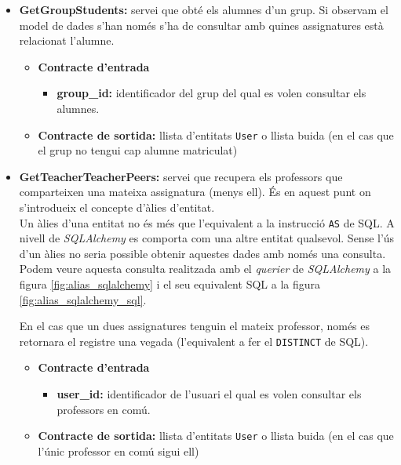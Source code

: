 \begin{itemize}
			\item \textbf{GetGroupStudents:} servei que obté els alumnes d'un grup. Si observam el model de dades s'han només s'ha de consultar amb quines assignatures està relacionat l'alumne.
				\begin{itemize}
					\item \textbf{Contracte d'entrada}
						\begin{itemize}
							\item \textbf{group\_id:} identificador del grup del qual es volen consultar els alumnes.
						\end{itemize}
					\item \textbf{Contracte de sortida:} llista d'entitats \texttt{User} o llista buida (en el cas que el grup no tengui cap alumne matriculat)
				\end{itemize}
				
			\item \textbf{GetTeacherTeacherPeers:} servei que recupera els professors que comparteixen una mateixa assignatura (menys ell). És en aquest punt on s'introdueix el concepte d'àlies d'entitat. \\
			
			Un àlies d'una entitat no és més que l'equivalent a la instrucció \texttt{AS} de \ac{SQL}. A nivell de \emph{SQLAlchemy} es comporta com una altre entitat qualsevol. Sense l'ús d'un àlies no seria possible obtenir aquestes dades amb només una consulta. Podem veure aquesta consulta realitzada amb el \emph{querier} de \emph{SQLAlchemy} a la figura \ref{fig:alias_sqlalchemy} i el seu equivalent \ac{SQL} a la figura \ref{fig:alias_sqlalchemy_sql}.
			
			En el cas que un dues assignatures tenguin el mateix professor, només es retornara el registre una vegada (l'equivalent a fer el \texttt{DISTINCT} de \ac{SQL}).
			
			\begin{itemize}
					\item \textbf{Contracte d'entrada}
						\begin{itemize}
							\item \textbf{user\_id:} identificador de l'usuari el qual es volen consultar els professors en comú.
						\end{itemize}
					\item \textbf{Contracte de sortida:} llista d'entitats \texttt{User} o llista buida (en el cas que l'únic professor en comú sigui ell)
				\end{itemize}
			

\end{itemize}
